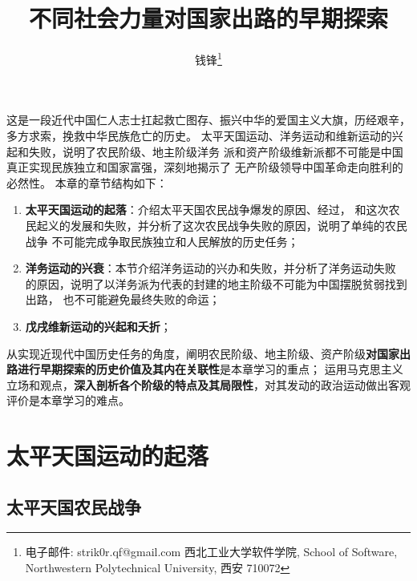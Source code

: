 \documentclass[utf-8, 10pt]{article}
\begin{document}

\title{不同社会力量对国家出路的早期探索}
\author{钱锋\thanks{电子邮件: strik0r.qf@gmail.com
\newline \indent 西北工业大学软件学院, School of Software, Northwestern Polytechnical University, 西安 710072
}}

\maketitle
\thispagestyle{empty}
    

{\small \tableofcontents}

这是一段近代中国仁人志士扛起救亡图存、振兴中华的爱国主义大旗，历经艰辛，
多方求索，挽救中华民族危亡的历史。
太平天国运动、洋务运动和维新运动的兴起和失败，说明了农民阶级、地主阶级洋务
派和资产阶级维新派都不可能是中国真正实现民族独立和国家富强，深刻地揭示了
无产阶级领导中国革命走向胜利的必然性。
本章的章节结构如下：
\begin{enumerate}[label=2.\arabic*,itemsep=0pt]
    \item \textbf{太平天国运动的起落}：介绍太平天国农民战争爆发的原因、经过，
    和这次农民起义的发展和失败，并分析了这次农民战争失败的原因，说明了单纯的农民战争
    不可能完成争取民族独立和人民解放的历史任务；
    \item \textbf{洋务运动的兴衰}：本节介绍洋务运动的兴办和失败，并分析了洋务运动失败
    的原因，说明了以洋务派为代表的封建的地主阶级不可能为中国摆脱贫弱找到出路，
    也不可能避免最终失败的命运；
    \item \textbf{戊戌维新运动的兴起和夭折}；
\end{enumerate}

从实现近现代中国历史任务的角度，阐明农民阶级、地主阶级、资产阶级\textbf{对国家出路进行早期探索的历史价值及其内在关联性}是本章学习的重点；
运用马克思主义立场和观点，\textbf{深入剖析各个阶级的特点及其局限性}，对其发动的政治运动做出客观评价是本章学习的难点。

\section{太平天国运动的起落}

\subsection{太平天国农民战争}
\end{document}
